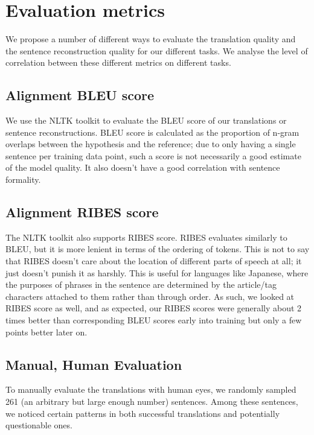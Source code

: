 \documentclass[11pt]{article}
\begin{document}
\section{Evaluation metrics}

We propose a number of different ways to evaluate the translation quality and the sentence reconstruction quality for our different tasks. We analyse the level of correlation between these different metrics on different tasks.

\subsection{Alignment BLEU score}

We use the NLTK toolkit \cite{NLTK} to evaluate the BLEU score of our translations or sentence reconstructions. BLEU score is calculated as the proportion of n-gram overlaps between the hypothesis and the reference; due to only having a single sentence per training data point, such a score is not necessarily a good estimate of the model quality. It also doesn't have a good correlation with sentence formality.

\subsection{Alignment RIBES score}

The NLTK toolkit \cite{NLTK} also supports RIBES score. RIBES evaluates similarly to BLEU, but it is more lenient in terms of the ordering of tokens. This is not to say that RIBES doesn't care about the location of different parts of speech at all; it just doesn't punish it as harshly. This is useful for languages like Japanese, where the purposes of phrases in the sentence are determined by the article/tag characters attached to them rather than through order. As such, we looked at RIBES score as well, and as expected, our RIBES scores were generally about 2 times better than corresponding BLEU scores early into training but only a few points better later on. 

\subsection{Manual, Human Evaluation}
To manually evaluate the translations with human eyes, we randomly sampled 261 (an arbitrary but large enough number) sentences. Among these sentences, we noticed certain patterns in both successful translations and potentially questionable ones. 
\end{document}
